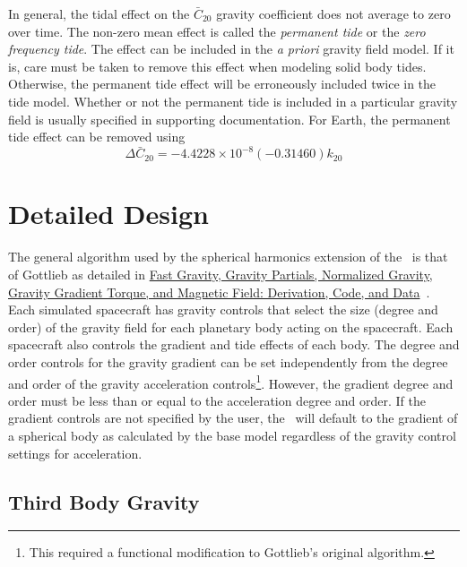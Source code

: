 In general, the tidal effect on the $\bar{C}_{20}$ gravity coefficient does not
average to zero over time.  The non-zero mean effect is called the
{\it permanent tide} or the {\it zero frequency tide}.  The effect can be
included in the {\it a priori} gravity field model.  If it is, care must be
taken to remove this effect when modeling solid body tides.  Otherwise, the
permanent tide effect will be erroneously included twice in the tide model.
Whether or not the permanent tide is included in a particular gravity field is
usually specified in supporting documentation.  For Earth, the permanent tide
effect can be removed using~\cite{IERS2003,Seidelmann}
\begin{equation}
\Delta\bar{C}_{20}= -4.4228\times10^{-8}(-0.31460)k_{20}
\end{equation}


\section{Detailed Design}

The general algorithm used by the spherical harmonics extension of the
\ModelDesc\ is that of Gottlieb as detailed in
\hyperref{file:\JEODHOME/models/environment/gravity/docs/gottlieb_1993.pdf}{part1}{reqt}
{Fast Gravity, Gravity Partials, Normalized Gravity, Gravity Gradient Torque,
and Magnetic Field: Derivation, Code, and Data}~\cite{JSC23762}.  Each simulated
spacecraft has gravity controls that select the size (degree and order) of the
gravity field for each planetary body acting on the spacecraft.  Each
spacecraft also controls the gradient and tide effects of each body.  The degree
and order controls for the gravity gradient can be set independently from the
degree and order of the gravity acceleration controls\footnote{This required a
functional modification to Gottlieb's original algorithm.}.  However, the
gradient degree and order must be less than or equal to the acceleration degree
and order.  If the gradient controls are not specified by the user, the
\ModelDesc\ will default to the gradient of a spherical body as calculated by
the base model regardless of the gravity control settings for acceleration.


\subsection{Third Body Gravity} \label{sssec:ThirdBody}

